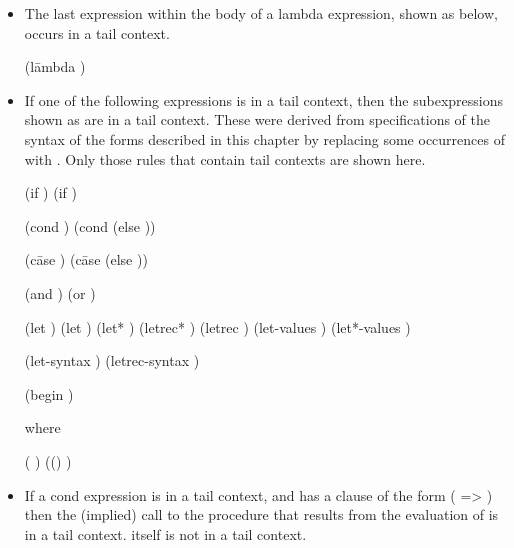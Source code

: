 \begin{itemize}
\item The last expression within the body of a lambda expression,
  shown as  below, occurs in a tail context.
\begin{grammar}%
(l\=ambda 
  \> 
  \> )
\end{grammar}%

\item If one of the following expressions is in a tail context,
then the subexpressions shown as  are in a tail context.
These were derived from specifications of the syntax of the forms described in
this chapter by replacing some occurrences of 
with .  Only those rules that contain tail contexts
are shown here.

\begin{grammar}%
(if   )
(if  )

(cond )
(cond  (else ))

(c\=ase 
  \>)
(c\=ase 
  \>
  \>(else ))

(and  )
(or  )

(let  )
(let   )
(let*  )
(letrec*  )
(letrec  )
(let-values  )
(let*-values  )

(let-syntax  )
(letrec-syntax  )

(begin )

{\rm where}

 \: ( )
 \: (() )

 \: 
\>\> 
 \:  
\end{grammar}%

\item
If a {\cf cond} expression is in a tail context, and has a clause of
the form {\cf ( => )}
then the (implied) call to
the procedure that results from the evaluation of  is in a
tail context.   itself is not in a tail context.

\end{itemize}

